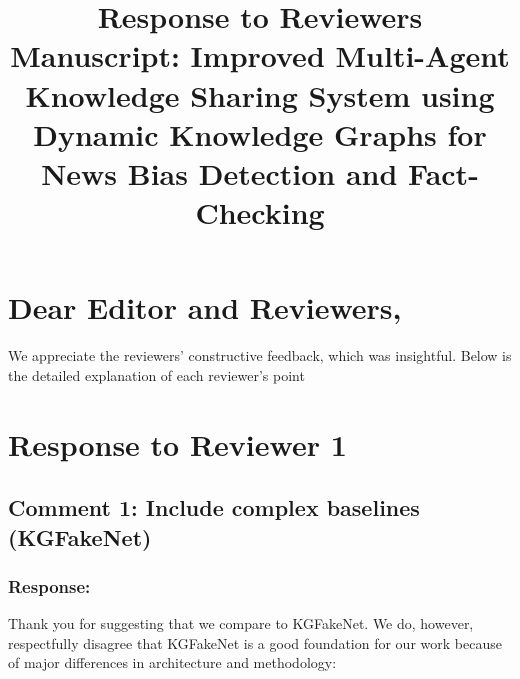 \documentclass[11pt]{article}
\title{\textbf{Response to Reviewers}\\
\large \textbf{Manuscript: Improved Multi-Agent Knowledge Sharing System using Dynamic Knowledge Graphs for News Bias Detection and Fact-Checking}}
\begin{document}
\maketitle

\section*{Dear Editor and Reviewers,}

We appreciate the reviewers'  constructive feedback, which was insightful. Below is the detailed explanation of each reviewer's point


\section{Response to Reviewer 1}

\subsection{Comment 1: Include complex baselines (KGFakeNet)}

\subsubsection*{Response:}
Thank you for suggesting that we compare to KGFakeNet. We do, however, respectfully disagree that KGFakeNet is a good foundation for our work because of major differences in architecture and methodology:
 
\end{document}
